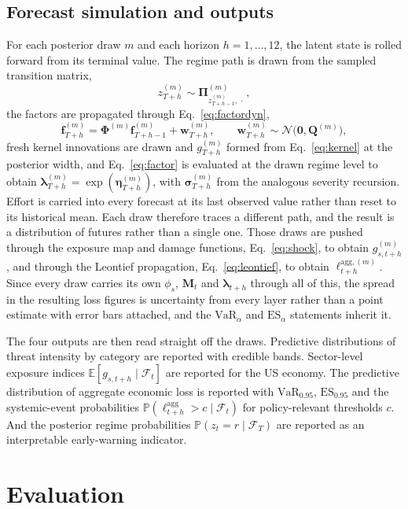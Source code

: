 \documentclass[review]{elsarticle}
\newcommand{\E}{\mathbb{E}}
\newcommand{\Prob}{\mathbb{P}}
\begin{document}
\subsection{Forecast simulation and outputs}

For each posterior draw $m$ and each horizon $h = 1, \dots, 12$, the latent state is rolled forward from its terminal value. The regime path is drawn from the sampled transition matrix,
\[
    z^{(m)}_{T+h} \sim \bm{\Pi}^{(m)}_{z^{(m)}_{T+h-1}, \,\cdot\,},
\]
the factors are propagated through Eq.~\ref{eq:factordyn},
\[
    \bm{f}^{(m)}_{T+h} = \bm{\Phi}^{(m)} \bm{f}^{(m)}_{T+h-1} + \bm{w}^{(m)}_{T+h},
    \qquad \bm{w}^{(m)}_{T+h} \sim \mathcal{N}\big(\bm{0}, \bm{Q}^{(m)}\big),
\]
fresh kernel innovations are drawn and $g^{(m)}_{T+h}$ formed from Eq.~\ref{eq:kernel} at the posterior width, and Eq.~\ref{eq:factor} is evaluated at the drawn regime level to obtain $\bm{\lambda}^{(m)}_{T+h} = \exp(\bm{\eta}^{(m)}_{T+h})$, with $\bm{\sigma}^{(m)}_{T+h}$ from the analogous severity recursion. Effort is carried into every forecast at its last observed value rather than reset to its historical mean. Each draw therefore traces a different path, and the result is a distribution of futures rather than a single one. Those draws are pushed through the exposure map and damage functions, Eq.~\ref{eq:shock}, to obtain $g^{(m)}_{s,t+h}$, and through the Leontief propagation, Eq.~\ref{eq:leontief}, to obtain $\ell^{\mathrm{agg},(m)}_{t+h}$. Since every draw carries its own $\phi_s$, $\bm{M}_t$ and $\bm{\lambda}_{t+h}$ through all of this, the spread in the resulting loss figures is uncertainty from every layer rather than a point estimate with error bars attached, and the $\mathrm{VaR}_\alpha$ and $\mathrm{ES}_\alpha$ statements inherit it.

The four outputs are then read straight off the draws. Predictive distributions of threat intensity by category are reported with credible bands. Sector-level exposure indices $\E[g_{s,t+h} \mid \mathcal{F}_t]$ are reported for the US economy. The predictive distribution of aggregate economic loss is reported with $\mathrm{VaR}_{0.95}$, $\mathrm{ES}_{0.95}$ and the systemic-event probabilities $\Prob(\ell^{\mathrm{agg}}_{t+h} > c \mid \mathcal{F}_t)$ for policy-relevant thresholds $c$. And the posterior regime probabilities $\Prob(z_t = r \mid \mathcal{F}_T)$ are reported as an interpretable early-warning indicator.

\section{Evaluation}\label{sec:eval}
\end{document}

